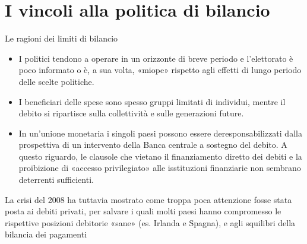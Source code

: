 \documentclass[aspectratio=149,11pt,italian]{beamer}
\begin{document}
\section{I vincoli alla politica di bilancio}

\begin{frame}{Le ragioni dei limiti di bilancio}

  \begin{itemize}
  \item I politici tendono a operare in un orizzonte di breve periodo e
    l'elettorato è poco informato o è, a sua volta, «miope» rispetto agli
    effetti di lungo periodo delle scelte politiche.
  \item I beneficiari delle spese sono spesso gruppi limitati di individui,
    mentre il debito si ripartisce sulla collettività e sulle generazioni
    future.
  \item In un'unione monetaria i singoli paesi possono essere
    deresponsabilizzati dalla prospettiva di un intervento della Banca
    centrale a sostegno del debito. A questo riguardo, le clausole che vietano
    il finanziamento diretto dei debiti e la proibizione di «accesso
    privilegiato» alle isstituzioni finanziarie non sembrano deterrenti
    sufficienti.
  \end{itemize}
  
\begin{block}{}
  La crisi del 2008 ha tuttavia mostrato come troppa poca attenzione fosse
  stata posta ai \alert{debiti privati}, per salvare i quali molti paesi hanno
  compromesso le rispettive posizioni debitorie «sane» (es. Irlanda e Spagna),
  e agli \alert{squilibri della bilancia dei pagamenti}
\end{block}
\end{frame}
\end{document}
